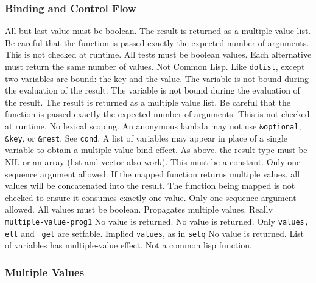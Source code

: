 \subsubsection{Binding and Control Flow}
\begin{list} %
{} {\setlength{\itemsep}{0in}\setlength{\labelwidth}{1in}
\setlength{\labelsep}{0in}
\setlength{\leftmargin}{1in}}
 {All but last value must be boolean.}
 {The result is returned as a multiple value list.  Be
careful that the function is passed exactly the expected number of
arguments.  This is not checked at runtime.}
 {All tests must be boolean values.  Each alternative must
return the same number of values.}
 {}
 {}
 {Not Common Lisp.  Like {\tt dolist}, except two
variables are bound: the key and the value.}
 {The variable is not bound during the evaluation of the result.}
 {The variable is not bound during the evaluation of the result.}
 { The result is returned as a multiple value list.  Be
careful that the function is passed exactly the expected number of
arguments.  This is not checked at runtime.}
 {No lexical scoping.  An anonymous lambda may not use
{\tt \&optional}, {\tt \&key}, or {\tt \&rest}. }
 {See {\tt cond}.}
 {A list of variables may appear in place of a single variable to
obtain a multiple-value-bind effect.}
 {As above.}
 {the result type must be NIL or an array (list and vector
also work).  This must be a constant.  Only one sequence argument allowed.}
 {If the mapped function returns multiple values, all values will
be concatenated into the result.  The function being mapped is not
checked to ensure it consumes exactly one value.  Only one sequence
argument allowed.}
 {All values must be boolean.}
 {Propagates multiple values.  Really {\tt multiple-value-prog1}}
 {}
 {No value is returned.}
 {No value is returned.  Only {\tt values, elt} and {\tt
get} are setfable.  Implied {\tt values}, as in {\tt setq}} 
 {No value is returned.  List of variables has
multiple-value effect.}
 {}
 {}
 {Not a common lisp function.}

\end{list}


\subsubsection{Multiple Values}
\begin{list} %
{} {\setlength{\itemsep}{0in}\setlength{\labelwidth}{2.5in}
\setlength{\labelsep}{0in}
\setlength{\leftmargin}{2.5in}}
 {}
 {}
 {}
\end{list}

